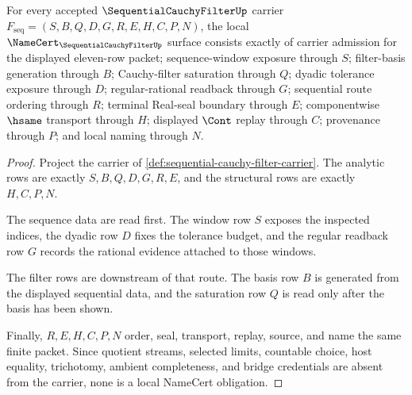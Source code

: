\begin{theorem}
\label{thm:sequential-cauchy-filter-namecert-obligations}
For every accepted $\SequentialCauchyFilterUp$ carrier $F_{\mathrm{seq}}=(S,B,Q,D,G,R,E,H,C,P,N)$, the local $\NameCert_{\SequentialCauchyFilterUp}$ surface consists exactly of carrier admission for the displayed eleven-row packet; sequence-window exposure through $S$; filter-basis generation through $B$; Cauchy-filter saturation through $Q$; dyadic tolerance exposure through $D$; regular-rational readback through $G$; sequential route ordering through $R$; terminal Real-seal boundary through $E$; componentwise $\hsame$ transport through $H$; displayed $\Cont$ replay through $C$; provenance through $P$; and local naming through $N$.
\end{theorem}
\begin{proof}
Project the carrier of \autoref{def:sequential-cauchy-filter-carrier}. The analytic rows are exactly $S,B,Q,D,G,R,E$, and the structural rows are exactly $H,C,P,N$.

The sequence data are read first. The window row $S$ exposes the inspected indices, the dyadic row $D$ fixes the tolerance budget, and the regular readback row $G$ records the rational evidence attached to those windows.

The filter rows are downstream of that route. The basis row $B$ is generated from the displayed sequential data, and the saturation row $Q$ is read only after the basis has been shown.

Finally, $R,E,H,C,P,N$ order, seal, transport, replay, source, and name the same finite packet. Since quotient streams, selected limits, countable choice, host equality, trichotomy, ambient completeness, and bridge credentials are absent from the carrier, none is a local NameCert obligation.
\end{proof}

